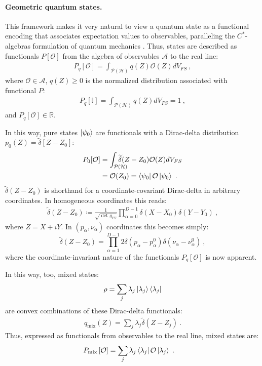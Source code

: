 \documentclass[nofootinbib,pre,twocolumn,showpacs,showkeys,groupaddress,preprintnumbers,floatfix]{revtex4-1}
\newcommand{\1}{\mathbbm{1}}
\newcommand{\intP}{\int_{\mathcal{P}(\mathcal{H})} \!\!\!\!\!\!\!\!\!}
\begin{document}
\paragraph*{Geometric quantum states.}
This framework makes it very natural to view a quantum state as a functional
encoding that associates expectation values to observables, paralleling the
$C^{*}$-algebras formulation of quantum mechanics \cite{Strocchi2008a}. Thus,
states are described as functionals $P[\mathcal{O}]$ from the algebra of
observables $\mathcal{A}$ to the real line: 
\begin{align}
P_q[\mathcal{O}]
  = \int_{\mathcal{P}(\mathcal{H})} q(Z) \mathcal{O}(Z) dV_{FS}
  ~,\label{eq:gqs}
\end{align}
where $\mathcal{O} \in \mathcal{A}$, $q(Z) \geq 0$ is the
normalized distribution associated with functional $P$:
\begin{align*}
P_q[\mathbb{I}] = \int_{\mathcal{P}(\mathcal{H})}
  q(Z) dV_{FS}  = 1
  ~,
\end{align*}
and $P_q[\mathcal{O}] \in \mathbb{R}$.

In this way, pure states $\ket{\psi_0}$ are functionals with a Dirac-delta
distribution $p_0(Z) = \widetilde{\delta}\left[ Z - Z_0\right]$:
\begin{align*}
P_{0}[\mathcal{O}] &= \intP \widetilde{\delta}(Z-Z_0)\mathcal{O}(Z) dV_{FS} \\
  & = \mathcal{O}(Z_0)  = \bra{\psi_0}\mathcal{O}\ket{\psi_0}
  ~.
\end{align*}
$\widetilde{\delta}(Z-Z_0)$ is shorthand for a coordinate-covariant Dirac-delta in
arbitrary coordinates. In homogeneous coordinates this reads:
\begin{align*}
\widetilde{\delta}(Z - Z_0) \coloneqq \frac{1}{\sqrt{\det g_{FS}}}
  \prod_{\alpha=0}^{D-1} \delta(X - X_0) \delta(Y - Y_0)
  ~,
\end{align*}
where $Z = X + iY$. In $(p_\alpha,\nu_\alpha)$ coordinates this becomes simply:
\begin{equation}
\widetilde{\delta}(Z - Z_0) = \prod_{\alpha=1}^{D-1} 2\delta(p_\alpha - p_\alpha^0) \delta(\nu_\alpha - \nu_\alpha^0)
  ~,
\end{equation}
where the coordinate-invariant nature of the functionals $P_q[\mathcal{O}]$ is
now apparent.

In this way, too, mixed states:
\begin{align*}
\rho = \sum_{j}\lambda_j \ket{\lambda_j}\bra{\lambda_j}
\end{align*}
are convex combinations of these Dirac-delta functionals:
\begin{align*}
q_{\mathrm{mix}}(Z) = \sum_{j}\lambda_j \widetilde{\delta}(Z-Z_j)
  ~. 
\end{align*}
Thus, expressed as functionals from observables to the real line, mixed states
are:
\begin{align}
P_{\mathrm{mix}}\left[ \mathcal{O}\right]
  & = \sum_{j} \lambda_j \bra{\lambda_j}\mathcal{O}\ket{\lambda_j}
  ~.
\label{eq:Functional}
\end{align}
\end{document}
